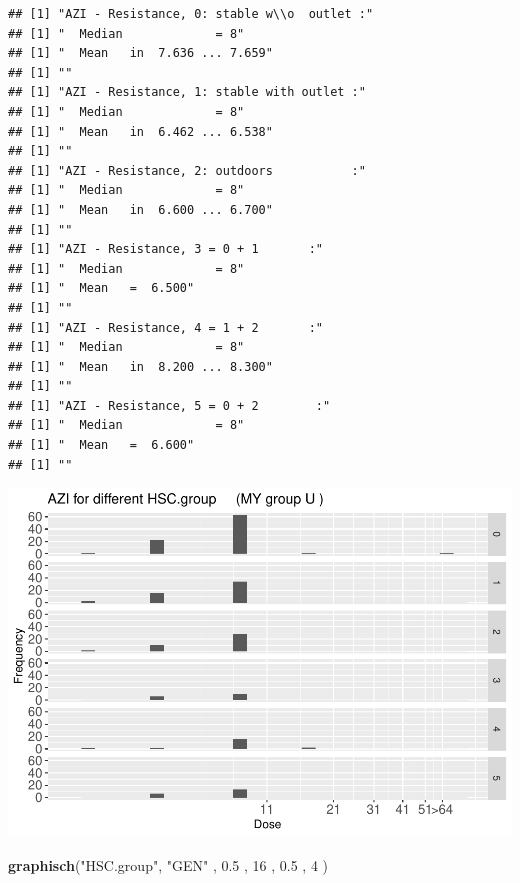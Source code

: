 \documentclass[
]{article}
\newenvironment{Shaded}{\begin{snugshade}}{\end{snugshade}}
\newcommand{\DecValTok}[1]{\textcolor[rgb]{0.00,0.00,0.81}{#1}}
\newcommand{\FloatTok}[1]{\textcolor[rgb]{0.00,0.00,0.81}{#1}}
\newcommand{\KeywordTok}[1]{\textcolor[rgb]{0.13,0.29,0.53}{\textbf{#1}}}
\newcommand{\NormalTok}[1]{#1}
\newcommand{\StringTok}[1]{\textcolor[rgb]{0.31,0.60,0.02}{#1}}
\begin{document}
\begin{verbatim}
## [1] "AZI - Resistance, 0: stable w\\o  outlet :"
## [1] "  Median             = 8"
## [1] "  Mean   in  7.636 ... 7.659"
## [1] ""
## [1] "AZI - Resistance, 1: stable with outlet :"
## [1] "  Median             = 8"
## [1] "  Mean   in  6.462 ... 6.538"
## [1] ""
## [1] "AZI - Resistance, 2: outdoors           :"
## [1] "  Median             = 8"
## [1] "  Mean   in  6.600 ... 6.700"
## [1] ""
## [1] "AZI - Resistance, 3 = 0 + 1       :"
## [1] "  Median             = 8"
## [1] "  Mean   =  6.500"
## [1] ""
## [1] "AZI - Resistance, 4 = 1 + 2       :"
## [1] "  Median             = 8"
## [1] "  Mean   in  8.200 ... 8.300"
## [1] ""
## [1] "AZI - Resistance, 5 = 0 + 2        :"
## [1] "  Median             = 8"
## [1] "  Mean   =  6.600"
## [1] ""
\end{verbatim}

\includegraphics{Verteilungen_files/figure-latex/unnamed-chunk-47-1.pdf}

\begin{Shaded}
\begin{Highlighting}[]
   \KeywordTok{graphisch}\NormalTok{(}\StringTok{"HSC.group"}\NormalTok{, }\StringTok{"GEN"}\NormalTok{ , }\FloatTok{0.5}\NormalTok{  ,  }\DecValTok{16}\NormalTok{   ,   }\FloatTok{0.5}\NormalTok{  ,   }\DecValTok{4}\NormalTok{    )}
\end{Highlighting}
\end{Shaded}
\end{document}
